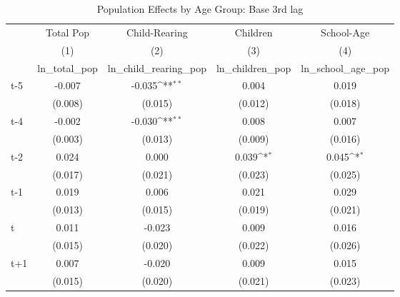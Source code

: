 \begin{table}[htbp]\centering
\def\sym#1{\ifmmode^{#1}\else\(^{#1}\)\fi}
\caption{Population Effects by Age Group: Base 3rd lag}
\begin{tabular}{l*{4}{c}}
\hline\hline
            &\multicolumn{1}{c}{Total Pop}&\multicolumn{1}{c}{Child-Rearing}&\multicolumn{1}{c}{Children}&\multicolumn{1}{c}{School-Age}\\\cmidrule(lr){2-2}\cmidrule(lr){3-3}\cmidrule(lr){4-4}\cmidrule(lr){5-5}
            &\multicolumn{1}{c}{(1)}&\multicolumn{1}{c}{(2)}&\multicolumn{1}{c}{(3)}&\multicolumn{1}{c}{(4)}\\
            &\multicolumn{1}{c}{ln\_total\_pop}&\multicolumn{1}{c}{ln\_child\_rearing\_pop}&\multicolumn{1}{c}{ln\_children\_pop}&\multicolumn{1}{c}{ln\_school\_age\_pop}\\
\hline
t-5         &      -0.007         &      -0.035\sym{**} &       0.004         &       0.019         \\
            &     (0.008)         &     (0.015)         &     (0.012)         &     (0.018)         \\
[1em]
t-4         &      -0.002         &      -0.030\sym{**} &       0.008         &       0.007         \\
            &     (0.003)         &     (0.013)         &     (0.009)         &     (0.016)         \\
[1em]
t-2         &       0.024         &       0.000         &       0.039\sym{*}  &       0.045\sym{*}  \\
            &     (0.017)         &     (0.021)         &     (0.023)         &     (0.025)         \\
[1em]
t-1         &       0.019         &       0.006         &       0.021         &       0.029         \\
            &     (0.013)         &     (0.015)         &     (0.019)         &     (0.021)         \\
[1em]
t           &       0.011         &      -0.023         &       0.009         &       0.016         \\
            &     (0.015)         &     (0.020)         &     (0.022)         &     (0.026)         \\
[1em]
t+1         &       0.007         &      -0.020         &       0.009         &       0.015         \\
            &     (0.015)         &     (0.020)         &     (0.021)         &     (0.023)         \\

\end{tabular}
\end{table}
